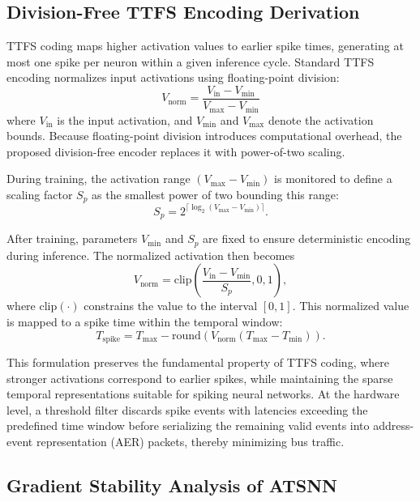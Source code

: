 \documentclass[12pt]{article}
\begin{document}
\subsection{Division-Free TTFS Encoding Derivation}

TTFS coding maps higher activation values to earlier spike times, generating at most one spike per neuron within a given inference cycle. Standard TTFS encoding normalizes input activations using floating-point division:  
\begin{equation}
V_{\mathrm{norm}} = \frac{V_{\mathrm{in}}-V_{\min}}{V_{\max}-V_{\min}}
\end{equation}
where $V_{\mathrm{in}}$ is the input activation, and $V_{\min}$ and $V_{\max}$ denote the activation bounds. Because floating-point division introduces computational overhead, the proposed division-free encoder replaces it with power-of-two scaling. 

During training, the activation range $(V_{\max}-V_{\min})$ is monitored to define a scaling factor $S_p$ as the smallest power of two bounding this range:
\begin{equation}
S_p = 2^{\lceil \log_2 (V_{\max}-V_{\min}) \rceil}.
\end{equation}

After training, parameters $V_{\min}$ and $S_p$ are fixed to ensure deterministic encoding during inference. The normalized activation then becomes
\begin{equation}
V_{\mathrm{norm}} = \mathrm{clip}\left(\frac{V_{\mathrm{in}}-V_{\min}}{S_p},0,1\right),
\end{equation}
where $\mathrm{clip}(\cdot)$ constrains the value to the interval $[0,1]$. This normalized value is mapped to a spike time within the temporal window:
\begin{equation}
T_{\mathrm{spike}} = T_{\max}-\mathrm{round}\left(V_{\mathrm{norm}}(T_{\max}-T_{\min})\right).
\end{equation}

This formulation preserves the fundamental property of TTFS coding, where stronger activations correspond to earlier spikes, while maintaining the sparse temporal representations suitable for spiking neural networks. At the hardware level, a threshold filter discards spike events with latencies exceeding the predefined time window before serializing the remaining valid events into address-event representation (AER) packets, thereby minimizing bus traffic.

\subsection{Gradient Stability Analysis of ATSNN}
\end{document}
